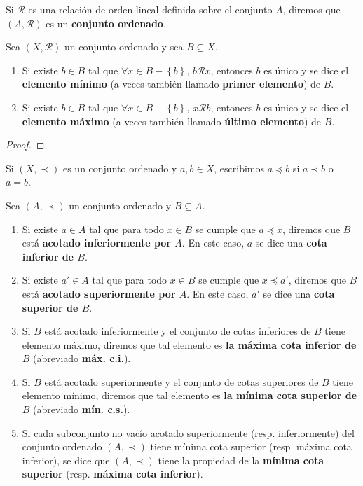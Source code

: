 \documentclass[12pt]{report}
\theoremstyle{largebreak}
\begin{document}
    \begin{mydef}
        Si $\mathcal{R}$ es una relación de orden lineal definida sobre el conjunto $A$, diremos que $(A,\mathcal{R})$ es un \textbf{conjunto ordenado}.
    \end{mydef}

    \begin{propo}
        Sea $(X,\mathcal{R})$ un conjunto ordenado y sea $B\subseteq X$.
        \begin{enumerate}
            \item Si existe $b\in B$ tal que $\forall x\in B-\left\{b\right\}$, $b\mathcal{R} x$, entonces $b$ es único y se dice el \textbf{elemento mínimo} (a veces también llamado \textbf{primer elemento}) de $B$.
            \item Si existe $b\in B$ tal que $\forall x\in B-\left\{b\right\}$, $x\mathcal{R} b$, entonces $b$ es único y se dice el \textbf{elemento máximo} (a veces también llamado \textbf{último elemento}) de $B$.
        \end{enumerate}
    \end{propo}

    \begin{proof}
        
    \end{proof}

    \begin{obs}
        Si $(X,\prec)$ es un conjunto ordenado y $a,b\in X$, escribimos $a\preceq b$ si $a\prec b$ o $a=b$.
    \end{obs}

    \begin{mydef}
        Sea $(A,\prec)$ un conjunto ordenado y $B\subseteq A$. 
        \begin{enumerate}
            \item Si existe $a\in A$ tal que para todo $x\in B$ se cumple que $a\preceq x$, diremos que $B$ está \textbf{acotado inferiormente por $A$}. En este caso, $a$ se dice una \textbf{cota inferior de $B$}.
            \item Si existe $a'\in A$ tal que para todo $x\in B$ se cumple que $x\preceq a'$, diremos que $B$ está \textbf{acotado superiormente por $A$}. En este caso, $a'$ se dice una \textbf{cota superior de $B$}.
            \item Si $B$ está acotado inferiormente y el conjunto de cotas inferiores de $B$ tiene elemento máximo, diremos que tal elemento es \textbf{la máxima cota inferior de $B$} (abreviado \textbf{máx. c.i.}).
            \item Si $B$ está acotado superiormente y el conjunto de cotas superiores de $B$ tiene elemento mínimo, diremos que tal elemento es \textbf{la mínima cota superior de $B$} (abreviado \textbf{mín. c.s.}).
            \item Si cada subconjunto no vacío acotado superiormente (resp. inferiormente) del conjunto ordenado $(A,\prec)$ tiene mínima cota superior (resp. máxima cota inferior), se dice que $(A,\prec)$ tiene la propiedad de la \textbf{mínima cota superior} (resp. \textbf{máxima cota inferior}).
        \end{enumerate}
    \end{mydef}
\end{document}
